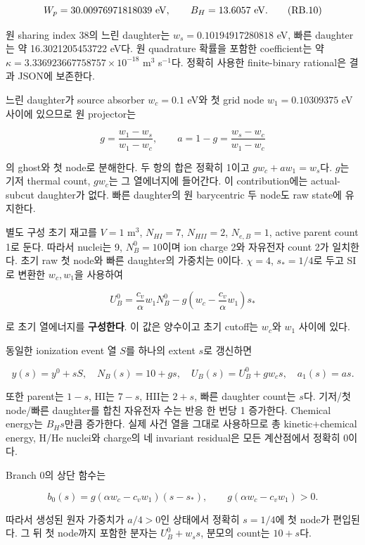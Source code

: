 \[W_p=30.00976971818039\ {\rm eV},\qquad B_H=13.6057\ {\rm eV}.\tag{RB.10}\]

원 sharing index 38의 느린 daughter는 \(w_s=0.10194917280818\) eV, 빠른 daughter는 약 16.3021205453722 eV다. 원 quadrature 확률을 포함한 coefficient는 약 \(\kappa=3.336923667758757\times10^{-18}\) m\(^3\) s\(^{-1}\)다. 정확히 사용한 finite-binary rational은 결과 JSON에 보존한다.

느린 daughter가 source absorber \(w_c=0.1\) eV와 첫 grid node \(w_1=0.10309375\) eV 사이에 있으므로 원 projector는

\[g=\frac{w_1-w_s}{w_1-w_c},\qquad a=1-g=\frac{w_s-w_c}{w_1-w_c}\tag{RB.11}\]

의 ghost와 첫 node로 분해한다. 두 항의 합은 정확히 1이고 \(g w_c+a w_1=w_s\)다. \(g\)는 기저 thermal count, \(g w_c\)는 그 열에너지에 들어간다. 이 contribution에는 actual-subcut daughter가 없다. 빠른 daughter의 원 barycentric 두 node도 raw state에 유지한다.

별도 구성 초기 재고를 \(V=1\) m\(^3\), \(N_{HI}=7\), \(N_{HII}=2\), \(N_{e,B}=1\), active parent count 1로 둔다. 따라서 nuclei는 9, \(N_B^0=10\)이며 ion charge 2와 자유전자 count 2가 일치한다. 초기 raw 첫 node와 빠른 daughter의 가중치는 0이다. \(\chi=4\), \(s_*=1/4\)로 두고 SI로 변환한 \(w_c,w_1\)을 사용하여

\[U_B^0=\frac{c_v}{\alpha}w_1N_B^0-g\left(w_c-\frac{c_v}{\alpha}w_1\right)s_*\tag{RB.12}\]

로 초기 열에너지를 \textbf{구성한다}. 이 값은 양수이고 초기 cutoff는 \(w_c\)와 \(w_1\) 사이에 있다.

동일한 ionization event 열 \(S\)를 하나의 extent \(s\)로 갱신하면

\[y(s)=y^0+sS,\quad N_B(s)=10+gs,\quad U_B(s)=U_B^0+gw_cs,\quad a_1(s)=as.\tag{RB.13}\]

또한 parent는 \(1-s\), HI는 \(7-s\), HII는 \(2+s\), 빠른 daughter count는 \(s\)다. 기저/첫 node/빠른 daughter를 합친 자유전자 수는 반응 한 번당 1 증가한다. Chemical energy는 \(B_Hs\)만큼 증가한다. 실제 사건 열을 그대로 사용하므로 총 kinetic+chemical energy, H/He nuclei와 charge의 네 invariant residual은 모든 계산점에서 정확히 0이다.

Branch 0의 상단 함수는

\[b_0(s)=g(\alpha w_c-c_vw_1)(s-s_*),\qquad g(\alpha w_c-c_vw_1)>0.\tag{RB.14}\]

따라서 생성된 원자 가중치가 \(a/4>0\)인 상태에서 정확히 \(s=1/4\)에 첫 node가 편입된다. 그 뒤 첫 node까지 포함한 분자는 \(U_B^0+w_ss\), 분모의 count는 \(10+s\)다.

